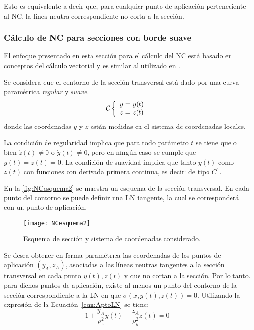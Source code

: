Esto es equivalente a decir que, para cualquier punto de aplicación perteneciente al NC, la línea neutra correspondiente no corta a la sección.


\subsubsection{Cálculo de NC para secciones con borde suave}

El enfoque presentado en esta sección para el cálculo del NC está basado en conceptos del cálculo vectorial y  es similar al utilizado en \citep{Mofid2001}. %
%

Se considera que el contorno de la sección transversal está dado por una curva paramétrica \textit{regular} y \textit{suave}. %
%
\begin{equation}
\mcC %
\left\{
\begin{array}{l}
y = y(t) \\
z = z(t) 
\end{array}
\right.
\end{equation}
donde las coordenadas $y$ y $z$ están medidas en el sistema de coordenadas locales.

La condición de regularidad implica que para todo parámetro $t$ se tiene que o bien $\dot{z}(t)\neq 0$ o $\dot{y}(t)\neq 0$, pero en ningún caso se cumple que $\dot{y}(t) = \dot{z}(t) = 0$. %
%
La condición de suavidad implica que tanto  $y(t)$ como $z(t)$ con funciones con derivada primera continua, es decir: de tipo $C^1$.

En la \autoref{fig:NCesquema2} se muestra un esquema de la sección transversal. %
%
En cada punto del contorno se puede definir una LN tangente, la cual se corresponderá con un punto de aplicación.

\begin{figure}[htb]
	\centering
	\texttt{[image: NCesquema2]}
	\caption{Esquema de sección y sistema de coordenadas considerado.}
	\label{fig:NCesquema2}
\end{figure}

Se desea obtener en forma paramétrica las coordenadas de los puntos de aplicación $(y_A,z_A)$, asociadas a las líneas neutras tangentes a la sección transversal en cada punto $y(t),z(t)$ y que no cortan a la sección. %
%
Por lo tanto, para dichos puntos de aplicación, existe al menos un punto del contorno de la sección correspondiente a la LN en que $\sigma(x,y(t),z(t)) = 0$. Utilizando la expresión de la Ecuación~\eqref{eqn:AptoLN} se tiene:
%
\begin{equation}
1 +  \frac{ y_A}{\rho_z^2} y(t) +  \frac{ z_A}{\rho_y^2} z(t) = 0
\end{equation}


